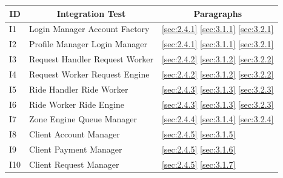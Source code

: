 \documentclass[a4paper,11pt]{report} %
\begin{document}
			\begin{center}
				\begin{tabular}{ l | p{7cm} | p{5cm} }\hline
					\multicolumn{1}{c|}{\textbf{ID}} & \multicolumn{1}{|c|}{\textbf{Integration Test}} & \multicolumn{1}{|c}{\textbf{Paragraphs}}\\\hline
					 I1 & Login Manager \textrightarrow Account Factory & \ref{sec:2.4.1} \hspace{25pt} \ref{sec:3.1.1} \hspace{25pt} \ref{sec:3.2.1}\\\hline
					 I2 & Profile Manager \textrightarrow Login Manager & \ref{sec:2.4.1} \hspace{25pt} \ref{sec:3.1.1} \hspace{25pt} \ref{sec:3.2.1}\\\hline
					 I3 & Request Handler \textrightarrow Request Worker & \ref{sec:2.4.2} \hspace{25pt} \ref{sec:3.1.2} \hspace{25pt} \ref{sec:3.2.2}\\\hline
					 I4 & Request Worker \textrightarrow Request Engine & \ref{sec:2.4.2} \hspace{25pt} \ref{sec:3.1.2} \hspace{25pt} \ref{sec:3.2.2}\\\hline
					 I5 & Ride Handler \textrightarrow Ride Worker & \ref{sec:2.4.3} \hspace{25pt} \ref{sec:3.1.3} \hspace{25pt} \ref{sec:3.2.3}\\\hline
					 I6 & Ride Worker \textrightarrow Ride Engine & \ref{sec:2.4.3} \hspace{25pt} \ref{sec:3.1.3} \hspace{25pt} \ref{sec:3.2.3}\\\hline
					 I7 & Zone Engine \textrightarrow Queue Manager & \ref{sec:2.4.4} \hspace{25pt} \ref{sec:3.1.4} \hspace{25pt} \ref{sec:3.2.4}\\\hline					 					 					 	
					 I8 & Client \textrightarrow Account Manager & \ref{sec:2.4.5} \hspace{25pt} \ref{sec:3.1.5}\\\hline		
					 I9 & Client \textrightarrow Payment Manager & \ref{sec:2.4.5} \hspace{25pt} \ref{sec:3.1.6}\\\hline					 					 					 	
					 I10 & Client \textrightarrow Request Manager & \ref{sec:2.4.5} \hspace{25pt} \ref{sec:3.1.7}\\\hline					 					 				

\end{tabular}
\end{center}
\end{document}
